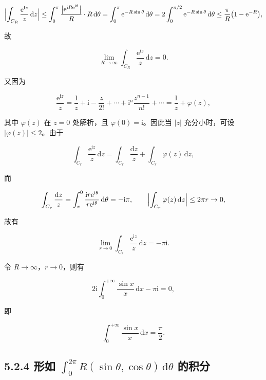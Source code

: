 \[
\Bigl|\int_{C_R}\frac{\mathrm e^{\mathrm i z}}{z}\,\mathrm dz\Bigr|
\le\int_{0}^{\pi}\frac{\bigl|\mathrm e^{\mathrm i R\mathrm e^{\mathrm i\theta}}\bigr|}{R}\cdot R\,\mathrm d\theta
=\int_{0}^{\pi}\mathrm e^{-R\sin\theta}\,\mathrm d\theta
=2\int_{0}^{\pi/2}\mathrm e^{-R\sin\theta}\,\mathrm d\theta
\le\frac{\pi}{R}\bigl(1-\mathrm e^{-R}\bigr),
\]

故

\[
\lim_{R\to\infty}\int_{C_R}\frac{\mathrm e^{\mathrm i z}}{z}\,\mathrm dz=0 .
\]

又因为

\[
\frac{\mathrm e^{\mathrm i z}}{z}
=\frac{1}{z}+\mathrm i-\frac{z}{2!}+\cdots+\mathrm i^{n}\frac{z^{n-1}}{n!}+\cdots
=\frac{1}{z}+\varphi(z),
\]

其中 \(\varphi(z)\) 在 \(z=0\) 处解析，且
\(\varphi(0)=\mathrm i\)。因此当 \(|z|\) 充分小时，可设
\(|\varphi(z)|\le2\)。由于

\[
\int_{C_r}\frac{\mathrm e^{\mathrm i z}}{z}\,\mathrm dz
=\int_{C_r}\frac{\mathrm dz}{z}+\int_{C_r}\varphi(z)\,\mathrm dz,
\]

而

\[
\int_{C_r}\frac{\mathrm dz}{z}
=\int_{\pi}^{0}\frac{\mathrm i r\mathrm e^{\mathrm i\theta}}{r\mathrm e^{\mathrm i\theta}}\,\mathrm d\theta
=-\mathrm i\pi,
\qquad
\Bigl|\int_{C_r}\varphi(z)\,\mathrm dz\Bigr|\le2\pi r\to0,
\]

故有

\[
\lim_{r\to0}\int_{C_r}\frac{\mathrm e^{\mathrm i z}}{z}\,\mathrm dz=-\pi\mathrm i .
\]

令 \(R\to\infty\)，\(r\to0\)，则有

\[
2\mathrm i\int_{0}^{+\infty}\frac{\sin x}{x}\,\mathrm dx-\pi\mathrm i=0,
\]

即

\[
\boxed{\displaystyle\int_{0}^{+\infty}\frac{\sin x}{x}\,\mathrm dx=\frac{\pi}{2}} .
\]

\subsection{\texorpdfstring{5.2.4 形如
\(\displaystyle\int_{0}^{2\pi}R(\sin\theta,\cos\theta)\,\mathrm d\theta\)
的积分}{5.2.4 形如 \textbackslash displaystyle\textbackslash int\_\{0\}\^{}\{2\textbackslash pi\}R(\textbackslash sin\textbackslash theta,\textbackslash cos\textbackslash theta)\textbackslash,\textbackslash mathrm d\textbackslash theta 的积分}}\label{ux5f62ux5982-displaystyleint_02pirsinthetacosthetamathrm-dtheta-ux7684ux79efux5206}

